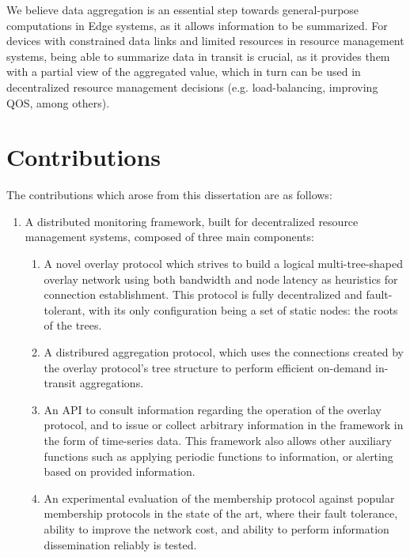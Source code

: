 We believe data aggregation is an essential step towards general-purpose computations in Edge systems, as it allows information to be summarized. For devices with constrained data links and limited resources in resource management systems, being able to summarize data in transit is crucial, as it provides them with a partial view of the aggregated value, which in turn can be used in decentralized resource management decisions (e.g. load-balancing, improving QOS, among others).

\section{Contributions}

The contributions which arose from this dissertation are as follows:

\begin{enumerate}
    \item A distributed monitoring framework, built for decentralized resource management systems, composed of three main components: {
        \begin{enumerate}
            \item A novel overlay protocol which strives to build a logical multi-tree-shaped overlay network using both bandwidth and node latency as heuristics for connection establishment. This protocol is fully decentralized and fault-tolerant, with its only configuration being a set of static nodes: the roots of the trees.
            
            \item A distribured aggregation protocol, which uses the connections created by the overlay protocol's tree structure to perform efficient on-demand in-transit aggregations.
            
            \item An API to consult information regarding the operation of the overlay protocol, and to issue or collect arbitrary information in the framework in the form of time-series data. This framework also allows other auxiliary functions such as applying periodic functions to information, or alerting based on provided information. 
            
            \item An experimental evaluation of the membership protocol against popular membership protocols in the state of the art, where their fault tolerance, ability to improve the network cost, and ability to perform information dissemination reliably is tested. 


\end{enumerate}}
\end{enumerate}
